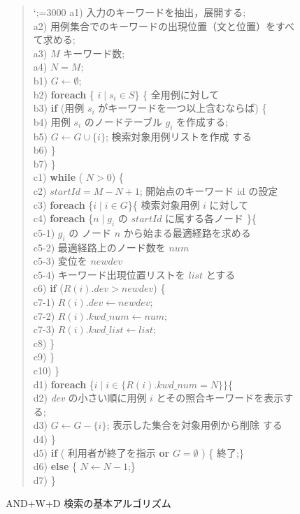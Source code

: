 \begin{figure}
\begin{quote}
\baselineskip=12pt
\sfcode`;=3000
\def\q{}
a1) \q 入力のキーワードを抽出，展開する;\\
a2) \q 用例集合でのキーワードの出現位置（文と位置）をすべて求める;\\
a3) \q $M$  キーワード数;\\
a4) \q $N = M$;\\[3mm]
b1) \q  $G \leftarrow \emptyset$;\\
b2) \q {\bf foreach} \{ $i \mid s_i \in S$\} \{   全用例に対して\\
b3) \q \q {\bf if} (用例 $s_i$ がキーワードを一つ以上含むならば) \{\\
b4) \q \q \q 用例 $s_i$ のノードテーブル $g_i$ を作成する;\\
b5) \q \q \q $G \leftarrow G \cup \{i\}$;  検索対象用例リストを作成
する\\ 
b6) \q \q \}\\
b7) \q \}\\[3mm]
c1) \q {\bf while} ( $N > 0$) \{\\
c2) \q \q $startId = M-N+1$;  開始点のキーワード id の設定\\
c3) \q \q {\bf foreach} \{$i \mid i \in G$\}\{  検索対象用例 $i$ に対して \\
c4) \q \q \q {\bf foreach} \{$n \mid g_i$ の $startId$ に属する各ノード
\}\{\\
c5-1) \q \q \q \q $g_i$ の ノード $n$ から始まる最適経路を求める\\
c5-2) \q \q \q \q 最適経路上のノード数を $num$\\
c5-3) \q \q \q \q 変位を $newdev$\\
c5-4) \q \q \q \q キーワード出現位置リストを $list$ とする\\
c6) \q \q \q \q {\bf if} ($R(i).dev > newdev$) \{\\
c7-1) \q \q \q \q \q $R(i).dev  \leftarrow newdev;$\\
c7-2) \q \q \q \q \q $R(i).kwd\_num \leftarrow num;$\\
c7-3) \q \q \q \q \q $R(i).kwd\_list \leftarrow list;$\\
c8) \q \q \q \q \}\\
c9) \q\q \q \}\\
c10) \q \q \}\\[3mm]
d1) \q \q {\bf foreach} \{$i \mid i \in \{R(i).kwd\_num = N\}\}$\{\\
d2) \q \q \q {\it dev} の小さい順に用例 $i$ とその照合キーワードを表示する;\\
d3) \q \q \q $G \leftarrow G - \{i\}$; 表示した集合を対象用例から削除
する\\
d4) \q \q \}\\
d5) \q \q {\bf if} ( 利用者が終了を指示 {\bf or} $G = \emptyset$ ) \{ 終了;\}\\
d6) \q \q {\bf else} \{ $N \leftarrow N - 1$;\}\\
d7) \q \}
\end{quote}
\caption{AND+W+D 検索の基本アルゴリズム}
\label{fig:shousai}
\end{figure}

